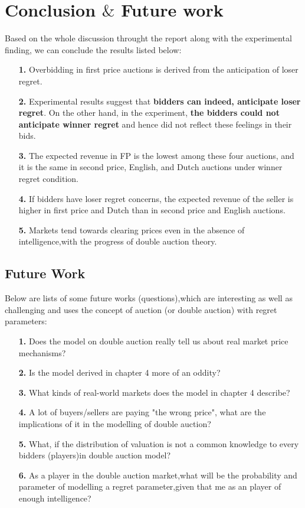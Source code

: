 \documentclass[10pt,a4paper,oneside]{report}
\begin{document}
\chapter{Conclusion $\textbf{\&}$ Future work}
Based on the whole discussion throught the report along with the experimental finding, we can conclude the results listed below:
\begin{enumerate}
\item[\textbf{1.}] Overbidding in first price auctions is derived from the anticipation of loser regret. 
\item[\textbf{2.}] Experimental results suggest that \textbf{bidders can indeed, anticipate loser regret}. On the other hand, in the experiment, \textbf{the bidders could not anticipate winner regret} and hence did not reflect these feelings in their bids.
\item[\textbf{3.}] The expected revenue in FP is the lowest among these four auctions, and it is the same in second price, English, and Dutch auctions under winner regret condition.
\item[\textbf{4.}] If bidders have loser regret concerns, the expected revenue of the seller is higher in first price and Dutch than in second price and English auctions.
\item[\textbf{5.}] Markets tend towards clearing prices even in the absence of intelligence,with the progress of double auction theory.
 \end{enumerate}
 \section{Future Work}
Below are lists of some future works (questions),which are interesting as well as challenging and uses the concept of auction (or double auction) with regret parameters:
 \begin{enumerate}
\item[\textbf{1.}] Does the model on double auction really tell us about real market price mechanisms?
\item[\textbf{2.}] Is the model derived in chapter 4 more of an oddity?
\item[\textbf{3.}] What kinds of real-world markets does the model in chapter 4 describe?
\item[\textbf{4.}] A lot of buyers/sellers are paying "the wrong price", what are the implications of it in the modelling of double auction?
\item[\textbf{5.}]What, if the distribution of valuation is not a common knowledge to every bidders (players)in double auction model?
\item[\textbf{6.}] As a player in the double auction market,what will be the probability and parameter of modelling a regret parameter,given that me as an player of enough intelligence?
\end{enumerate}
\nocite{*}


\end{document}
